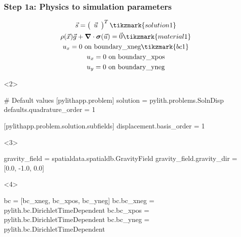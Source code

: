 \documentclass[aspectratio=169]{beamer}
\begin{document}
\begin{frame}[t,fragile]
  \frametitle{Step 1a: Physics to simulation parameters}
  \summary{}

  \begin{minipage}[t]{0.3\textwidth}
    {\scriptsize
    \begin{gather*}
    \vec{s} = \left(\begin{array}{c} \vec{u} \end{array}\right)^T \tikzmark{solution1}\\
    \rho(\vec{x}) \vec{g} + \tensor{\nabla} \cdot \tensor{\sigma}(\vec{u}) = \vec{0} \tikzmark{material1}\\
    u_x = 0 \text{ on boundary\_xneg} \tikzmark{bc1}\\
    u_x = 0 \text{ on boundary\_xpos} \\
    u_y = 0 \text{ on boundary\_yneg} \\
    \end{gather*}}
  \end{minipage}
  \hfill
  \begin{minipage}[t]{0.67\textwidth}
    \begin{onlyenv}<2>
      \begin{cfgcode}
        # Default values
        [pylithapp.problem]
        solution = pylith.problems.SolnDisp
        defaults.quadrature_order = 1
        
        [pylithapp.problem.solution.subfields]
        displacement.basis_order = 1
      \end{cfgcode}
    \end{onlyenv}
    \begin{onlyenv}<3>
      \begin{cfgcode}
        gravity_field = spatialdata.spatialdb.GravityField
        gravity_field.gravity_dir = [0.0, -1.0, 0.0]
      \end{cfgcode}
    \end{onlyenv}
    \begin{onlyenv}<4>
      \begin{cfgcode}
        bc = [bc_xneg, bc_xpos, bc_yneg]
        bc.bc_xneg = pylith.bc.DirichletTimeDependent
        bc.bc_xpos = pylith.bc.DirichletTimeDependent
        bc.bc_yneg = pylith.bc.DirichletTimeDependent
        

\end{cfgcode}
\end{onlyenv}
\end{minipage}
\end{frame}
\end{document}
